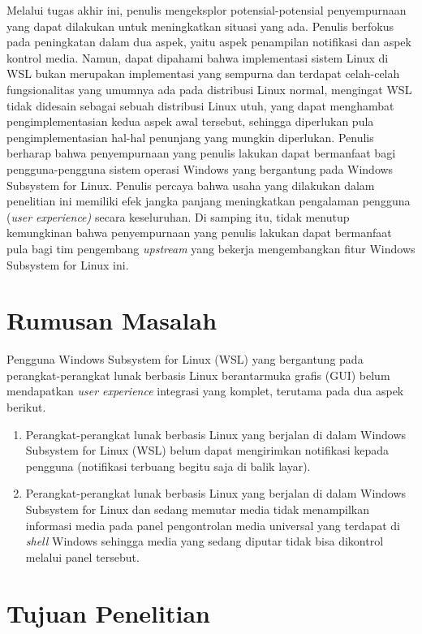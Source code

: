 Melalui tugas akhir ini, penulis mengeksplor potensial-potensial penyempurnaan yang dapat dilakukan untuk meningkatkan situasi yang ada. Penulis berfokus pada peningkatan dalam dua aspek, yaitu aspek penampilan notifikasi dan aspek kontrol media. Namun, dapat dipahami bahwa implementasi sistem Linux di WSL bukan merupakan implementasi yang sempurna dan terdapat celah-celah fungsionalitas yang umumnya ada pada distribusi Linux normal, mengingat WSL tidak didesain sebagai sebuah distribusi Linux utuh, yang dapat menghambat pengimplementasian kedua aspek awal tersebut, sehingga diperlukan pula pengimplementasian hal-hal penunjang yang mungkin diperlukan. Penulis berharap bahwa penyempurnaan yang penulis lakukan dapat bermanfaat bagi pengguna-pengguna sistem operasi Windows yang bergantung pada Windows Subsystem for Linux. Penulis percaya bahwa usaha yang dilakukan dalam penelitian ini memiliki efek jangka panjang meningkatkan pengalaman pengguna (\textit{user experience)} secara keseluruhan. Di samping itu, tidak menutup kemungkinan bahwa penyempurnaan yang penulis lakukan dapat bermanfaat pula bagi tim pengembang \textit{upstream} yang bekerja mengembangkan fitur Windows Subsystem for Linux ini.

\section{Rumusan Masalah}

Pengguna Windows Subsystem for Linux (WSL) yang bergantung pada perangkat-perangkat lunak berbasis Linux berantarmuka grafis (GUI) belum mendapatkan \textit{user experience} integrasi yang komplet, terutama pada dua aspek berikut.
\begin{enumerate}
    \item Perangkat-perangkat lunak berbasis Linux yang berjalan di dalam Windows Subsystem for Linux (WSL) belum dapat mengirimkan notifikasi kepada pengguna (notifikasi terbuang begitu saja di balik layar).
    \item Perangkat-perangkat lunak berbasis Linux yang berjalan di dalam Windows Subsystem for Linux dan sedang memutar media tidak menampilkan informasi media pada panel pengontrolan media universal yang terdapat di \textit{shell} Windows sehingga media yang sedang diputar tidak bisa dikontrol melalui panel tersebut.
\end{enumerate}

\section{Tujuan Penelitian}

